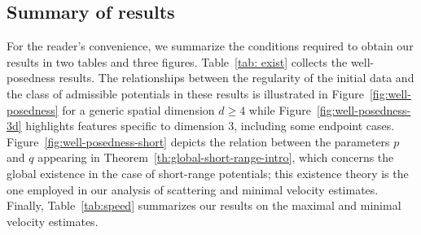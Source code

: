 \documentclass[12pt]{article}
\theoremstyle{plain}
\begin{document}
\subsection{Summary of results}
For the reader's convenience, we summarize the conditions required to obtain our results in two tables and three figures. Table~\ref{tab: exist} collects the well-posedness results. The relationships between the regularity of the initial data and the class of admissible potentials in these results is illustrated in Figure~\ref{fig:well-posedness} for a generic spatial dimension $d\ge4$ while Figure~\ref{fig:well-posedness-3d} highlights features specific to dimension $3$, including some endpoint cases. Figure~\ref{fig:well-posedness-short} depicts the relation between the parameters $p$ and $q$ appearing in Theorem~\ref{th:global-short-range-intro}, which concerns the global existence in the case of short-range potentials; this existence theory is the one employed in our analysis of scattering and minimal velocity estimates. Finally, Table~\ref{tab:speed} summarizes our results on the maximal and minimal velocity estimates.
%
\end{document}
